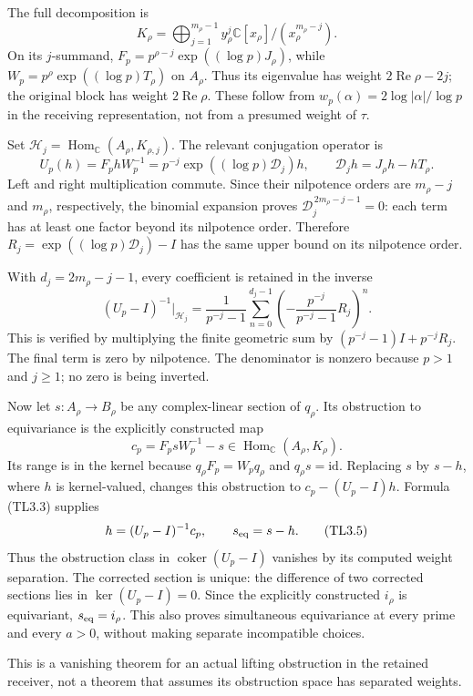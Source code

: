 The full decomposition is \[
K_\rho=\bigoplus_{j=1}^{m_\rho-1}
y_\rho^j\mathbb C[x_\rho]/(x_\rho^{m_\rho-j}).
\tag{TL3.1}
\] On its \(j\)-summand, \(F_p=p^{\rho-j}\exp((\log p)J_\rho)\), while
\(W_p=p^\rho\exp((\log p)T_\rho)\) on \(A_\rho\). Thus its eigenvalue
has weight \(2\operatorname{Re}\rho-2j\); the original block has weight
\(2\operatorname{Re}\rho\). These follow from
\(w_p(\alpha)=2\log|\alpha|/\log p\) in the receiving representation,
not from a presumed weight of \(\tau\).

Set \(\mathcal H_j=\operatorname{Hom}_{\mathbb C}(A_\rho,K_{\rho,j})\).
The relevant conjugation operator is \[
U_p(h)=F_phW_p^{-1}
=p^{-j}\exp((\log p)\mathcal D_j)h,\qquad
\mathcal D_jh=J_\rho h-hT_\rho.
\tag{TL3.2}
\] Left and right multiplication commute. Since their nilpotence orders
are \(m_\rho-j\) and \(m_\rho\), respectively, the binomial expansion
proves \(\mathcal D_j^{\,2m_\rho-j-1}=0\): each term has at least one
factor beyond its nilpotence order. Therefore
\(R_j=\exp((\log p)\mathcal D_j)-I\) has the same upper bound on its
nilpotence order.

With \(d_j=2m_\rho-j-1\), every coefficient is retained in the inverse
\[
(U_p-I)^{-1}\big|_{\mathcal H_j}
=\frac1{p^{-j}-1}
\sum_{n=0}^{d_j-1}
\left(-\frac{p^{-j}}{p^{-j}-1}R_j\right)^n.
\tag{TL3.3}
\] This is verified by multiplying the finite geometric sum by
\((p^{-j}-1)I+p^{-j}R_j\). The final term is zero by nilpotence. The
denominator is nonzero because \(p>1\) and \(j\ge1\); no zero is being
inverted.

Now let \(s:A_\rho\to B_\rho\) be any complex-linear section of
\(q_\rho\). Its obstruction to equivariance is the explicitly
constructed map \[
c_p=F_psW_p^{-1}-s\in\operatorname{Hom}_{\mathbb C}(A_\rho,K_\rho).
\tag{TL3.4}
\] Its range is in the kernel because \(q_\rho F_p=W_pq_\rho\) and
\(q_\rho s=\mathrm{id}\). Replacing \(s\) by \(s-h\), where \(h\) is
kernel-valued, changes this obstruction to \(c_p-(U_p-I)h\). Formula
(TL3.3) supplies \[
h=(U_p-I)^{-1}c_p,\qquad s_{\rm eq}=s-h.
\tag{TL3.5}
\] Thus the obstruction class in \(\operatorname{coker}(U_p-I)\)
vanishes by its computed weight separation. The corrected section is
unique: the difference of two corrected sections lies in
\(\ker(U_p-I)=0\). Since the explicitly constructed \(i_\rho\) is
equivariant, \(s_{\rm eq}=i_\rho\). This also proves simultaneous
equivariance at every prime and every \(a>0\), without making separate
incompatible choices.

This is a vanishing theorem for an actual lifting obstruction in the
retained receiver, not a theorem that assumes its obstruction space has
separated weights.

